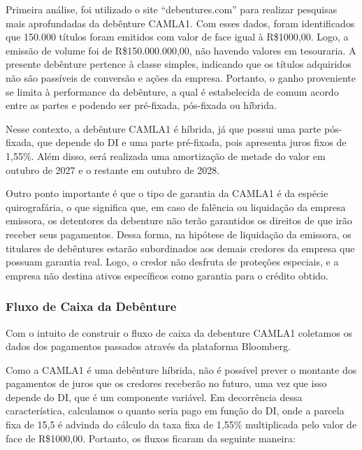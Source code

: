 \documentclass[11pt]{article}
\newcommand{\real}[1]{R\$#1}
\begin{document}
Primeira análise, foi utilizado o site “debentures.com”  para realizar pesquisas mais aprofundadas da debênture CAMLA1. Com esses dados, foram identificados que 150.000 títulos foram emitidos com valor de face igual à \real{1000,00}. Logo, a emissão de volume foi de \real{150.000.000,00}, não havendo valores em tesouraria. A presente debênture pertence à classe simples, indicando que os títulos adquiridos não são passíveis de conversão e ações da empresa. Portanto, o ganho proveniente se limita à performance da debênture, a qual é estabelecida de comum acordo entre as partes e podendo ser pré-fixada, pós-fixada ou híbrida.

Nesse contexto, a debênture CAMLA1 é híbrida, já que possui uma parte pós-fixada, que depende do DI e uma parte pré-fixada, pois apresenta juros fixos de 1,55\%. Além disso, será realizada uma amortização de metade do valor em outubro de 2027 e o restante em outubro de 2028.

Outro ponto importante é que o tipo de garantia da CAMLA1 é da espécie quirografária, o que significa que, em caso de falência ou liquidação da empresa emissora, os detentores da debenture não terão garantidos os direitos de que irão receber seus pagamentos. Dessa forma, na hipótese de liquidação da emissora, os titulares de debêntures estarão subordinados aos demais credores da empresa que possuam garantia real. Logo, o credor não desfruta de proteções especiais, e a empresa não destina ativos específicos como garantia para o crédito obtido. 

\subsubsection{\textbf{Fluxo de Caixa da Debênture}}
Com o intuito de construir o fluxo de caixa da debenture CAMLA1 coletamos os dados dos pagamentos passados através da plataforma Bloomberg.

Como a CAMLA1 é uma debênture híbrida, não é possível prever o montante dos pagamentos de juros que os credores receberão no futuro, uma vez que isso depende do DI, que é um componente variável. Em decorrência dessa característica, calculamos o quanto seria pago em função do DI, onde a parcela fixa  de 15,5 é advinda do cálculo da taxa fixa de 1,55\% multiplicada pelo valor de face de \real{1000,00}. Portanto, os fluxos ficaram da seguinte maneira:
\end{document}
